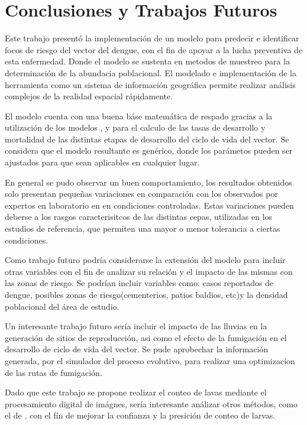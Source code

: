 \chapter{Conclusiones y Trabajos Futuros}
Este trabajo presentó la implementación de un modelo para predecir e identificar focos de riesgo
del vector del dengue, con el fin de apoyar a la lucha preventiva de esta enfermedad. Donde el
modelo se sustenta en metodos de muestreo para la determinación de la abundacia poblacional. El
modelado e implementación de la herramienta como un sistema de información geográfica permite
realizar análisis complejos de la realidad espacial rápidamente.

El modelo cuenta con una buena báse matemática de respado gracias a la utilización de los modelos
\citet{sharpe1977reaction}, \citet{schoolfield1981non} y \citet{otero2006stochastic} para el
calculo de las tasas de desarrollo y mortalidad de las distintas etapas de desarrollo del ciclo de
vida del vector. Se considera que el modelo resultante es genérico, donde los parámetos pueden ser
ajustados para que sean aplicables en cualquier lugar.

En general se pudo observar un buen comportamiento, los resultados obtenidos solo presentan
pequeñas variaciones en comparación con los observados por expertos en laboratorio en en
condiciones controladas. Estas variaciones pueden deberse a los rasgos caracterisitcos de las
distintas cepas, utilizadas en los estudios de referencia, que permiten una mayor o menor
tolerancia a ciertas condiciones.

Como trabajo futuro podría considerarse la extensión del modelo para incluir otras variables
con el fin de analizar su relación y el impacto de las mismas con las zonas de riesgo. Se podrían
incluir variables como: casos reportados de dengue, posibles zonas de riesgo(cementerios, patios
baldios, etc)y la densidad poblacional del área de estudio.

Un interesante trabajo futuro sería incluir el impacto de las lluvias en la generación de sitios
de reproducción, asi como el efecto de la fumigación en el desarrollo de ciclo de vida del vector.
Se pude aprobechar la información generada, por el simulador del proceso evolutivo, para realizar
una optimizacíon de las rutas de fumigación.

Dado que este trabajo se propone realizar el conteo de lavas mediante el procesamiento digital de
imágnes, sería interesante análizar otros métodos, como el de \cite{gonzalez2008segmentacion},
con el fín de mejorar la confianza y la presición de conteo de larvas.
